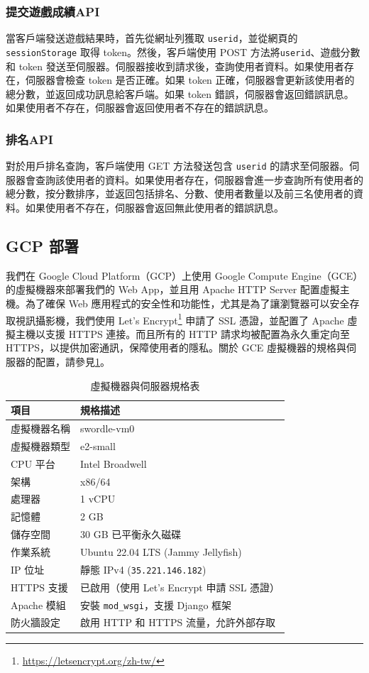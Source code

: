 \documentclass[conference]{IEEEtran}
\begin{document}
\subsubsection{提交遊戲成績API}
當客戶端發送遊戲結果時，首先從網址列獲取 \verb|userid|，並從網頁的\verb|sessionStorage| 取得 token。然後，客戶端使用 POST 方法將\verb|userid|、遊戲分數和 token 發送至伺服器。伺服器接收到請求後，查詢使用者資料。如果使用者存在，伺服器會檢查 token 是否正確。如果 token 正確，伺服器會更新該使用者的總分數，並返回成功訊息給客戶端。如果 token 錯誤，伺服器會返回錯誤訊息。如果使用者不存在，伺服器會返回使用者不存在的錯誤訊息。

\subsubsection{排名API}
對於用戶排名查詢，客戶端使用 GET 方法發送包含 \verb|userid| 的請求至伺服器。伺服器會查詢該使用者的資料。如果使用者存在，伺服器會進一步查詢所有使用者的總分數，按分數排序，並返回包括排名、分數、使用者數量以及前三名使用者的資料。如果使用者不存在，伺服器會返回無此使用者的錯誤訊息。

\subsection{GCP 部署}
我們在 Google Cloud Platform（GCP）上使用 Google Compute Engine（GCE）的虛擬機器來部署我們的 Web App，並且用 Apache HTTP Server 配置虛擬主機。為了確保 Web 應用程式的安全性和功能性，尤其是為了讓瀏覽器可以安全存取視訊攝影機，我們使用 Let's Encrypt\footnote{\url{https://letsencrypt.org/zh-tw/}} 申請了 SSL 憑證，並配置了 Apache 虛擬主機以支援 HTTPS 連接。而且所有的 HTTP 請求均被配置為永久重定向至 HTTPS，以提供加密通訊，保障使用者的隱私。關於 GCE 虛擬機器的規格與伺服器的配置，請參見\cref{tab:vm-spec}。

\begin{table}[htbp]
    \caption{虛擬機器與伺服器規格表}
    \label{tab:vm-spec}
    \centering
    \begin{tabular}{|l|l|}
    \hline
        項目 & 規格描述 \\
    \hline
        虛擬機器名稱 & swordle-vm0 \\
        虛擬機器類型 & e2-small \\
        CPU 平台 & Intel Broadwell \\
        架構 & x86/64 \\
        處理器 & 1 vCPU \\
        記憶體 & 2 GB \\
        儲存空間 & 30 GB 已平衡永久磁碟 \\
        作業系統 & Ubuntu 22.04 LTS (Jammy Jellyfish) \\
        IP 位址 & 靜態 IPv4 (\verb|35.221.146.182|) \\
        HTTPS 支援 & 已啟用（使用 Let's Encrypt 申請 SSL 憑證） \\
        Apache 模組 & 安裝 \verb|mod_wsgi|，支援 Django 框架 \\
        防火牆設定 & 啟用 HTTP 和 HTTPS 流量，允許外部存取 \\
    \hline
    \end{tabular}
\end{table}
\end{document}
